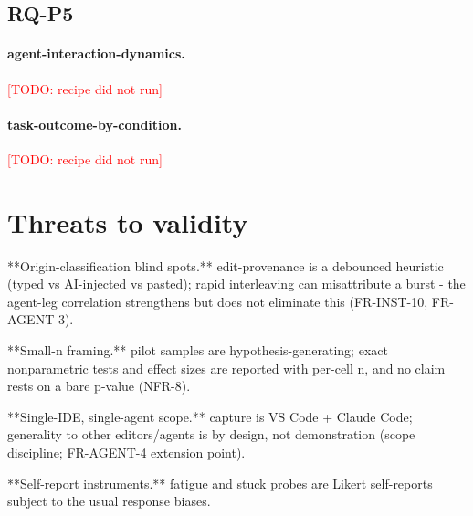 \documentclass[11pt]{article}
\newcommand{\todo}[1]{\textcolor{red}{[TODO: #1]}}
\begin{document}
\subsection{RQ-P5}

\paragraph{agent-interaction-dynamics.} \todo{recipe did not run}

\paragraph{task-outcome-by-condition.} \todo{recipe did not run}

\section{Threats to validity}

**Origin-classification blind spots.** edit-provenance is a debounced heuristic (typed vs AI-injected vs pasted); rapid interleaving can misattribute a burst - the agent-leg correlation strengthens but does not eliminate this (FR-INST-10, FR-AGENT-3).

**Small-n framing.** pilot samples are hypothesis-generating; exact nonparametric tests and effect sizes are reported with per-cell n, and no claim rests on a bare p-value (NFR-8).

**Single-IDE, single-agent scope.** capture is VS Code + Claude Code; generality to other editors/agents is by design, not demonstration (scope discipline; FR-AGENT-4 extension point).

**Self-report instruments.** fatigue and stuck probes are Likert self-reports subject to the usual response biases.



\end{document}
